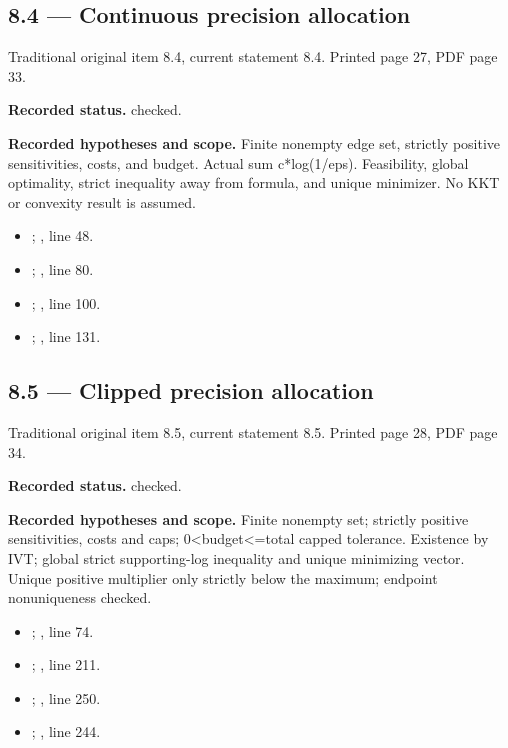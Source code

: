 \subsection{8.4 — Continuous precision allocation}
\label{result:8.4}
{\footnotesize\color{muted}Traditional original item 8.4, current statement 8.4. Printed page 27, PDF page 33.}\par
\textbf{Recorded status.} checked.

\textbf{Recorded hypotheses and scope.} Finite nonempty edge set, strictly positive sensitivities, costs, and budget. Actual sum c*log(1/eps). Feasibility, global optimality, strict inequality away from formula, and unique minimizer. No KKT or convexity result is assumed.

\begin{itemize}
\item {}; , line 48.
\item {}; , line 80.
\item {}; , line 100.
\item {}; , line 131.
\end{itemize}
\subsection{8.5 — Clipped precision allocation}
\label{result:8.5}
{\footnotesize\color{muted}Traditional original item 8.5, current statement 8.5. Printed page 28, PDF page 34.}\par
\textbf{Recorded status.} checked.

\textbf{Recorded hypotheses and scope.} Finite nonempty set; strictly positive sensitivities, costs and caps; 0<budget<=total capped tolerance. Existence by IVT; global strict supporting-log inequality and unique minimizing vector. Unique positive multiplier only strictly below the maximum; endpoint nonuniqueness checked.

\begin{itemize}
\item {}; , line 74.
\item {}; , line 211.
\item {}; , line 250.
\item {}; , line 244.
\end{itemize}

